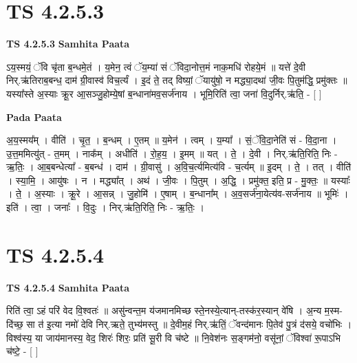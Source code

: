 \documentclass[17pt]{extarticle}
\begin{document}

\section{ TS 4.2.5.3 }

\textbf{TS 4.2.5.3 } \newline
\textbf{Samhita Paata} \newline

ऽय॒स्मयं॒ ॅवि चृ॑ता ब॒न्धमे॒तं । य॒मेन॒ त्वं ॅय॒म्या॑ सं ॅविदा॒नोत्त॒मं नाक॒मधि॑ रोहये॒मं ॥ यत्ते॑ दे॒वी निर्.ऋ॑तिराब॒बन्ध॒ दाम॑ ग्री॒वास्व॑ विच॒र्त्यं । इ॒दं ते॒ तद् विष्यां॒ ॅयायु॑षो॒ न मद्ध्या॒दथा॑ जी॒वः पि॒तुम॑द्धि॒ प्रमु॑क्तः ॥ यस्या᳚स्ते अ॒स्याः क्रू॒र आ॒सञ्जु॒होम्ये॒षां ब॒न्धाना॑मव॒सर्ज॑नाय । भूमि॒रिति॑ त्वा॒ जना॑ वि॒दुर्निर्.ऋ॑ति॒ - [  ] \newline

\textbf{Pada Paata} \newline

अ॒य॒स्मय᳚म् । वीति॑ । चृ॒त॒ । ब॒न्धम् । ए॒तम् ॥ य॒मेन॑ । त्वम् । य॒म्या᳚ । सं॒ॅवि॒दा॒नेति॑ सं - वि॒दा॒ना । उ॒त्त॒ममित्यु॑त् - त॒मम् । नाक᳚म् । अधीति॑ । रो॒ह॒य॒ । इ॒मम् ॥ यत् । ते॒ । दे॒वी । निर्.ऋ॑ति॒रिति॒ निः - ऋ॒तिः॒ । आ॒ब॒बन्धेत्या᳚ - ब॒बन्ध॑ । दाम॑ । ग्री॒वासु॑ । अ॒वि॒च॒र्त्यमित्य॑वि - च॒र्त्यम् ॥ इ॒दम् । ते॒ । तत् । वीति॑ । स्या॒मि॒ । आयु॑षः । न । मद्ध्या᳚त् । अथ॑ । जी॒वः । पि॒तुम् । अ॒द्धि॒ । प्रमु॑क्त॒ इति॒ प्र - मु॒क्तः॒ ॥ यस्याः᳚ । ते॒ । अ॒स्याः । क्रू॒रे । आ॒सन्न् । जु॒होमि॑ । ए॒षाम् । ब॒न्धाना᳚म् । अ॒व॒सर्ज॑ना॒येत्य॑व-सर्ज॑नाय ॥ भूमिः॑ । इति॑ । त्वा॒ । जनाः᳚ । वि॒दुः । निर्.ऋ॑ति॒रिति॒ निः - ऋ॒तिः॒ ।  \newline





\section{ TS 4.2.5.4 }

\textbf{TS 4.2.5.4 } \newline
\textbf{Samhita Paata} \newline

रिति॑ त्वा॒ ऽहं परि॑ वेद वि॒श्वतः॑ ॥ असु॑न्वन्त॒म य॑जमानमिच्छ स्ते॒नस्ये॒त्यान्-तस्क॑र॒स्यान् वे॑षि । अ॒न्य म॒स्म-दि॑च्छ॒ सा त॑ इ॒त्या नमो॑ देवि निर्.ऋते॒ तुभ्य॑मस्तु ॥ दे॒वीम॒हं निर्.ऋ॑तिं॒ ॅवन्द॑मानः पि॒तेव॑ पु॒त्रं द॑सये॒ वचो॑भिः । विश्व॑स्य॒ या जाय॑मानस्य॒ वेद॒ शिरः॑ शिरः॒ प्रति॑ सू॒री वि च॑ष्टे ॥ नि॒वेश॑नः स॒ङ्गम॑नो॒ वसू॑नां॒ ॅविश्वा॑ रू॒पाऽभि च॑ष्टे॒ - [  ] \newline
\end{document}
